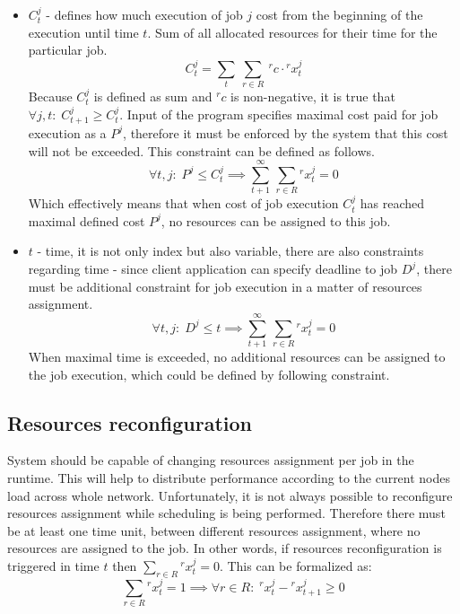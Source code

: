 \begin{itemize}
\begin{equation}
	      \end{equation}
	\item $C_{t}^{j}$ - defines how much execution of job $j$ cost from the beginning of the execution until time $t$.
	      Sum of all allocated resources for their time for the particular job.
	      \begin{equation}
	      	C_{t}^{j} = \sum_{t}\:\sum_{r \in R}\: {}^{r}c \cdot {}^{r}x_{t}^{j} 
	      \end{equation}
	      Because $C_{t}^{j}$ is defined as sum and ${}^{r}c$ is non-negative,
	      it is true that $\forall j, t:\; C_{t+1}^{j} \geq C_{t}^{j}$.
	      Input of the program specifies maximal cost paid for job execution as a $P^j$, 
	      therefore it must be enforced by the system that this cost will not be exceeded.
	      This constraint can be defined as follows.
	      \begin{equation}
	      	\forall t, j:\; P^{j} \leq C_{t}^{j} \implies \sum_{t+1}^{\infty} \, \sum_{r \in R} {}^{r}x_{t}^{j} = 0 
	      \end{equation}
	      Which effectively means that when cost of job execution $C_{t}^{j}$ has reached maximal defined cost $P^{j}$,
	      no resources can be assigned to this job.
	\item $t$ - time, it is not only index but also variable, there are also constraints regarding time -
	      since client application can specify deadline to job $D^{j}$,
	      there must be additional constraint for job execution in a matter of resources assignment.
	      \begin{equation}
	      	\forall t, j:\; D^{j} \leq t \implies \sum_{t+1}^{\infty} \, \sum_{r \in R} {}^{r}x_{t}^{j} = 0 
	      \end{equation}
	      When maximal time is exceeded, no additional resources can be assigned to the job execution, 
	      which could be defined by following constraint.
\end{itemize}

\subsection{Resources reconfiguration}\label{subsec:resource-config}
System should be capable of changing resources assignment per job in the runtime.
This will help to distribute performance according to the current nodes load across whole network.
Unfortunately, it is not always possible to reconfigure resources assignment while scheduling is being performed.
Therefore there must be at least one time unit, between different resources assignment,
where no resources are assigned to the job.
In other words, if resources reconfiguration is triggered in time $t$ then $\sum_{r \in R} {}^{r}x_{t}^{j} = 0$.
This can be formalized as:
\begin{equation}
	\sum_{r \in R} {}^{r}x_{t}^{j} = 1 \implies \forall r \in R:\; {}^{r}x_{t}^{j} - {}^{r}x_{t + 1}^{j} \geq 0
\end{equation}

